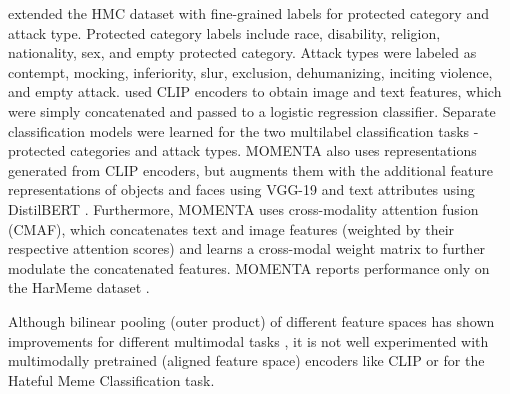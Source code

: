 \documentclass[11pt]{article}
\begin{document}
\citet{mathias-etal-2021-findings} extended the HMC dataset with  fine-grained labels for protected category  and attack type. Protected category labels include race, disability, religion, nationality, sex, and empty protected category. Attack types were labeled as contempt, mocking, inferiority, slur, exclusion, dehumanizing, inciting violence, and empty attack. \citet{zia-etal-2021-racist} used CLIP \citep{radford2021learning} encoders to obtain image and text features, which were simply concatenated and passed to a logistic regression classifier. Separate classification models were learned for the two multilabel classification tasks - protected categories and attack types. MOMENTA \citep{pramanick2021momenta} also uses representations generated from CLIP encoders, but augments them with the additional feature representations of objects and faces using VGG-19 \cite{simonyan2014very} and text attributes using DistilBERT \cite{sanh2019distilbert}. Furthermore, MOMENTA uses cross-modality attention fusion (CMAF), which concatenates text and image features (weighted by their respective attention scores) and learns a cross-modal weight matrix to further modulate the concatenated features. MOMENTA reports performance only on the HarMeme dataset \cite{s2020detecting}.

Although bilinear pooling \cite{tenenbaum2000separating} (outer product) of different feature spaces has shown improvements for different multimodal tasks \cite{fukui2016multimodal, arevalo2017gated, kiela2018efficient}, it is not well experimented with multimodally pretrained (aligned feature space) encoders like CLIP or for the Hateful Meme Classification task.
\end{document}
